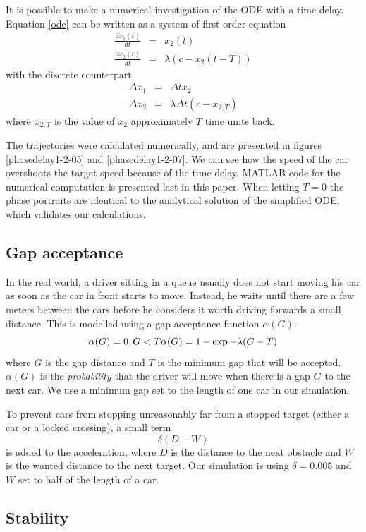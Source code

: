 \documentclass[11pt,a4paper]{article}
\begin{document}
It is possible to make a numerical investigation of the ODE with a time delay.
Equation \ref{ode} can be written as a system of first order equation
\begin{eqnarray*}
\frac{dx_1(t)}{dt} &=& x_2(t) \\
\frac{dx_2(t)}{dt} &=& \lambda \left( c - x_2(t-T) \right)
\end{eqnarray*}
with the discrete counterpart
\begin{eqnarray*}
\Delta x_1 &=& \Delta t x_2 \\
\Delta x_2 &=& \lambda \Delta t ( c - x_{2,T})
\end{eqnarray*}
where $x_{2,T}$ is the value of $x_2$ approximately $T$ time units back.

The trajectories were calculated numerically, and are presented in figures
\ref{phasedelay1-2-05} and \ref{phasedelay1-2-07}. We can see how the speed of
the car overshoots the target speed because of the time delay. MATLAB code for
the numerical computation is presented last in this paper. When letting $T=0$
the phase portraits are identical to the analytical solution of the simplified
ODE, which validates our calculations.

\subsection{Gap acceptance}
In the real world, a driver sitting in a queue usually does not start moving his car as
soon as the car in front starts to move. Instead, he waits until there are a few meters
between the cars before he considers it worth driving forwards a small distance.
This is modelled using a gap acceptance function $\alpha(G)$:
\[ \alpha(G) = 0, G < T\\
\alpha(G) = 1 - \exp{-\lambda(G - T)} \]
where $G$ is the gap distance and $T$ is the minimum gap that will be accepted.
$\alpha(G)$ is the \emph{probability} that the driver will move when there is a gap $G$
to the next car. We use a minimum gap set to the length of one car in our simulation.

To prevent cars from stopping unreasonably far from a stopped target (either a car or a
locked crossing), a small term \[ \delta (D - W) \] is added to the acceleration,
where $D$ is the distance to the next obstacle and $W$ is the wanted distance to the next target.
Our simulation is using $\delta = 0.005$ and $W$ set to half of the length of a car.

\subsection{Stability}
\end{document}
